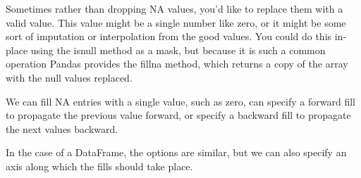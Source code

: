 Sometimes rather than dropping NA values, you'd like to replace them with a valid
value. This value might be a single number like zero, or it might be some sort of
imputation or interpolation from the good values. You could do this in-place using
the isnull method as a mask, but because it is such a common operation Pandas
provides the fillna method, which returns a copy of the array with the null values
replaced.

We can fill NA entries with a single value, such as zero, can specify a forward fill to propagate the previous value forward, or specify a backward fill to propagate the next values backward.

In the case of a DataFrame, the options are similar, but we can also specify an axis
along which the fills should take place.



